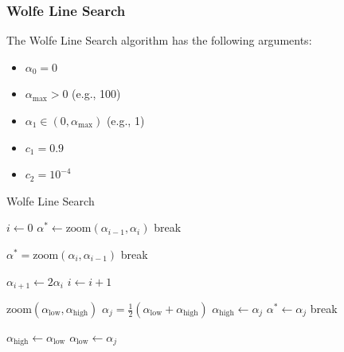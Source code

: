 \documentclass[letterpaper]{article}
\begin{document}
\subsubsection{Wolfe Line Search}
The Wolfe Line Search algorithm has the following arguments: 
\begin{itemize}
    \item $\alpha_0 = 0$
    \item $\alpha_{\max} > 0$ (e.g., 100)
    \item $\alpha_1 \in (0, \alpha_{\max})$ (e.g., 1)
    \item $c_1 = 0.9$
    \item $c_2 = 10^{-4}$
\end{itemize}
\begin{algorithm}[H]
    \caption{Wolfe Line Search}
    \begin{algorithmic}[1]
            \State $i \gets 0$
                    \State $\alpha^* \gets \text{zoom}(\alpha_{i - 1}, \alpha_{i})$
                    \State break 
                \EndIf 

                    \State $\alpha^* = \text{zoom}(\alpha_i, \alpha_{i - 1})$
                    \State break 
                \EndIf 

                \State $\alpha_{i + 1} \gets 2 \alpha_i$
                \State $i \gets i + 1$
            \EndWhile 

            \State $\text{zoom}(\alpha_{\text{low}}, \alpha_{\text{high}})$
                \State $\alpha_j = \frac{1}{2}(\alpha_{\text{low}} + \alpha_{\text{high}})$
                    \State $\alpha_{\text{high}} \gets \alpha_j$
                \Else 
                        \State $\alpha^* \gets \alpha_j$
                        \State break 
                    \EndIf 

                        \State $\alpha_{\text{high}} \gets \alpha_{\text{low}}$
                    \EndIf 
                    \State $\alpha_{\text{low}} \gets \alpha_j$
                \EndIf 
            \EndWhile 
        \EndFunction 
    \end{algorithmic}
\end{algorithm}
\end{document}
